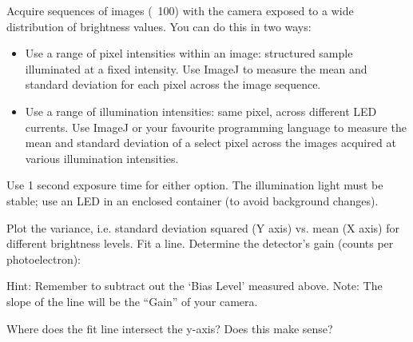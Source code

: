\documentclass[a4paper]{report}
\newcommand{\nexercise}[0]{\arabic{exercises}\addtocounter{exercises}{1}}
\begin{document}
\begin{exercisebox}[frametitle={Exercise \nexercise: Measure shot noise}]
Acquire sequences of images (~100) with the camera exposed to a wide distribution of brightness values. You can do this in two ways:
\begin{itemize}
	\item Use a range of pixel intensities within an image: structured sample illuminated at a fixed intensity. Use ImageJ to measure the mean and standard deviation for each pixel across the image sequence.
	\item Use a range of illumination intensities: same pixel, across different LED currents. Use ImageJ or your favourite programming language to measure the mean and standard deviation of a select pixel across the images acquired at various illumination intensities.
\end{itemize}
Use 1 second exposure time for either option. The illumination light must be stable; use an LED in an enclosed container (to avoid background changes). 

Plot the variance, i.e. standard deviation squared (Y axis) vs. mean (X axis) for different brightness levels. Fit a line. 
Determine the detector’s gain (counts per photoelectron): 

Hint: Remember to subtract out the ‘Bias Level’ measured above.
Note: The slope of the line will be the “Gain” of your camera.

Where does the fit line intersect the y-axis? Does this make sense? 
\end{exercisebox}
\end{document}
